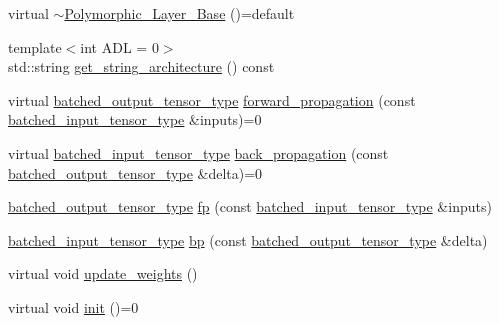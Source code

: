 \begin{DoxyCompactItemize}
\item 
virtual \hyperlink{structbc_1_1nn_1_1Polymorphic__Layer__Base_a6d3d973826a90e84e1f1ef3127198388}{$\sim$\+Polymorphic\+\_\+\+Layer\+\_\+\+Base} ()=default
\item 
{\footnotesize template$<$int A\+DL = 0$>$ }\\std\+::string \hyperlink{structbc_1_1nn_1_1Polymorphic__Layer__Base_a987b737aeb1b1000dcb1b67ea551087b}{get\+\_\+string\+\_\+architecture} () const
\item 
virtual \hyperlink{structbc_1_1nn_1_1Polymorphic__Layer__Base_a45ed57549be9c4e5c40c52168ca15ae9}{batched\+\_\+output\+\_\+tensor\+\_\+type} \hyperlink{structbc_1_1nn_1_1Polymorphic__Layer__Base_a0dc71591b6ca387501c2cace61be3e78}{forward\+\_\+propagation} (const \hyperlink{structbc_1_1nn_1_1Polymorphic__Layer__Base_ae694b03dd73923ff973b0d2c9156e161}{batched\+\_\+input\+\_\+tensor\+\_\+type} \&inputs)=0
\item 
virtual \hyperlink{structbc_1_1nn_1_1Polymorphic__Layer__Base_ae694b03dd73923ff973b0d2c9156e161}{batched\+\_\+input\+\_\+tensor\+\_\+type} \hyperlink{structbc_1_1nn_1_1Polymorphic__Layer__Base_ae68fb249544a51c79be7aca6fb4a0727}{back\+\_\+propagation} (const \hyperlink{structbc_1_1nn_1_1Polymorphic__Layer__Base_a45ed57549be9c4e5c40c52168ca15ae9}{batched\+\_\+output\+\_\+tensor\+\_\+type} \&delta)=0
\item 
\hyperlink{structbc_1_1nn_1_1Polymorphic__Layer__Base_a45ed57549be9c4e5c40c52168ca15ae9}{batched\+\_\+output\+\_\+tensor\+\_\+type} \hyperlink{structbc_1_1nn_1_1Polymorphic__Layer__Base_a71ab20a7baff5faf1c3d5ff16552a983}{fp} (const \hyperlink{structbc_1_1nn_1_1Polymorphic__Layer__Base_ae694b03dd73923ff973b0d2c9156e161}{batched\+\_\+input\+\_\+tensor\+\_\+type} \&inputs)
\item 
\hyperlink{structbc_1_1nn_1_1Polymorphic__Layer__Base_ae694b03dd73923ff973b0d2c9156e161}{batched\+\_\+input\+\_\+tensor\+\_\+type} \hyperlink{structbc_1_1nn_1_1Polymorphic__Layer__Base_a317faf7f621b09947ac22385d26e61e4}{bp} (const \hyperlink{structbc_1_1nn_1_1Polymorphic__Layer__Base_a45ed57549be9c4e5c40c52168ca15ae9}{batched\+\_\+output\+\_\+tensor\+\_\+type} \&delta)
\item 
virtual void \hyperlink{structbc_1_1nn_1_1Polymorphic__Layer__Base_ac4e83d85cab03ae8ac5d918fe4e08df6}{update\+\_\+weights} ()
\item 
virtual void \hyperlink{structbc_1_1nn_1_1Polymorphic__Layer__Base_a2259b176573690bfbbc93adc743212c9}{init} ()=0
\item 

\end{DoxyCompactItemize}
